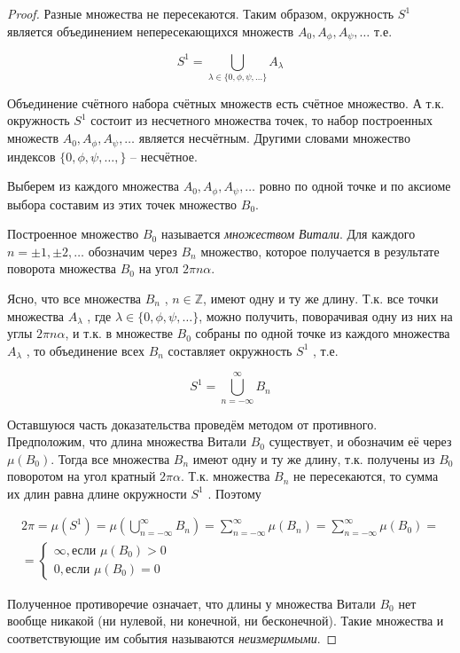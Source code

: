 \begin{proof}
Разные множества не пересекаются. Таким образом, окружность $S^1$ является объединением непересекающихся множеств $A_0, A_\phi, A_\psi , \ldots $ т.е.

\begin{equation*}
	S^1=\bigcup\limits_{\lambda\in\{0,\phi,\psi,\ldots\}}A_\lambda
\end{equation*}

Объединение счётного набора счётных множеств есть счётное множество.
А т.к. окружность $S^1$ состоит из несчетного множества точек, то набор построенных множеств $A_0, A_\phi, A_\psi , \ldots $ является несчётным. Другими словами множество индексов $\{0, \phi, \psi, \ldots ,\}$ -- несчётное.

Выберем из каждого множества $A_0, A_\phi, A_\psi , \ldots $ ровно по одной точке и по аксиоме выбора составим из этих точек множество $B_0$. 

Построенное множество $B_0$ называется \textit{множеством Витали}. Для каждого $n=\pm1, \pm2, \ldots$ обозначим через $B_n$ множество, которое получается в результате поворота множества $B_0$ на угол $2\pi n\alpha$. 

Ясно, что все множества $B_n$ , $n\in \mathbb{Z}$, имеют одну и ту же длину. Т.к. все точки множества $A_\lambda$ , где $\lambda \in \{0, \phi, \psi, \ldots\}$, можно получить, поворачивая одну из них на углы $2\pi n\alpha$, и т.к. в множестве $B_0$ собраны по одной точке из каждого множества $A_\lambda$ , то объединение всех $B_n$ составляет окружность $S^1$ , т.е.

\begin{equation*}
	S^1=\bigcup\limits_{n=-\infty}^{\infty}B_n
\end{equation*}

Оставшуюся часть доказательства проведём методом от противного. Предположим, что длина множества Витали $B_0$ существует, и обозначим её через $\mu(B_0)$. Тогда все множества $B_n$ имеют одну и ту же длину, т.к. получены из $B_0$ поворотом на угол кратный $2\pi\alpha$. Т.к. множества $B_n$ не пересекаются, то сумма их длин равна длине окружности $S^1$ . Поэтому

\begin{gather*}
	2\pi=\mu(S^1)=\mu\left(\bigcup\limits_{n=-\infty}^{\infty}B_n\right)=\sum\limits_{n=-\infty}^{\infty}\mu(B_n)=
	\sum\limits_{n=-\infty}^{\infty}\mu(B_0)=\\
	=
	\left\{
		\begin{aligned}
			\infty, \text{если } \mu(B_0)>0\\
			0, \text{если } \mu(B_0)=0
		\end{aligned}
	\right.
\end{gather*}

Полученное противоречие означает, что длины у множества Витали $B_0$ нет вообще никакой (ни нулевой, ни конечной, ни бесконечной). Такие множества и соответствующие им события называются \textit{неизмеримыми}.
\end{proof}

